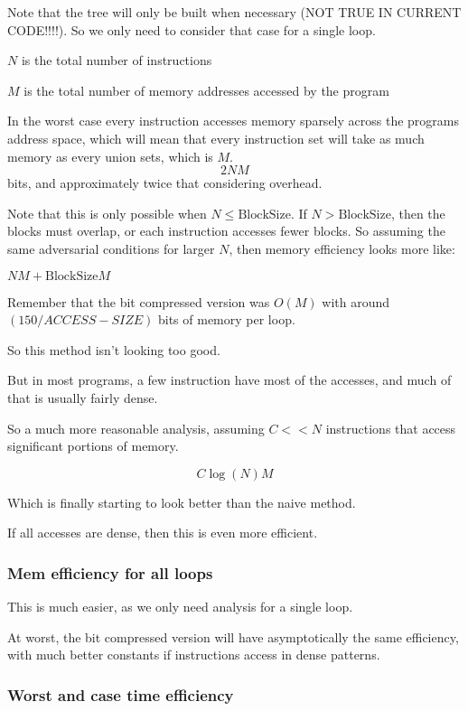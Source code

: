 \documentclass[12pt,twoside]{reedthesis}
\begin{document}
		Note that the tree will only be built when necessary (NOT TRUE IN CURRENT CODE!!!!). So we only need to consider that case for a single loop.
		
		$N$ is the total number of instructions
		
		$M$ is the total number of memory addresses accessed by the program
		
		In the worst case every instruction accesses memory sparsely across the programs address space, which will mean that every instruction set will take as much memory as every union sets, which is $M$. 
		$$2N M$$ 
		bits, and approximately twice that considering overhead. 
		
		Note that this is only possible when $N \le \text{BlockSize}$. If $N > \text{BlockSize}$, then the blocks must overlap, or each instruction accesses fewer blocks. So assuming the same adversarial conditions for larger $N$, then memory efficiency looks more like:
		
		$NM + \text{BlockSize}M$
		
		Remember that the bit compressed version was $O(M)$ with around $(150/ACCESS-SIZE)$ bits of memory per loop.
		
		So this method isn't looking too good. 
		
		But in most programs, a few instruction have most of the accesses, and much of that is usually fairly dense. 
		
		So a much more reasonable analysis, assuming $C << N$ instructions that access significant portions of memory.
		
		$$C\log(N)M$$ 
		
		Which is finally starting to look better than the naive method. 
		
		If all accesses are dense, then this is even more efficient.
		
		\subsubsection{Mem efficiency for all loops}
		
		This is much easier, as we only need analysis for a single loop. 
		
		At worst, the bit compressed version will have asymptotically the same efficiency, with much better constants if instructions access in dense patterns. 
		
		\subsubsection{Worst and case time efficiency}
		
\end{document}
